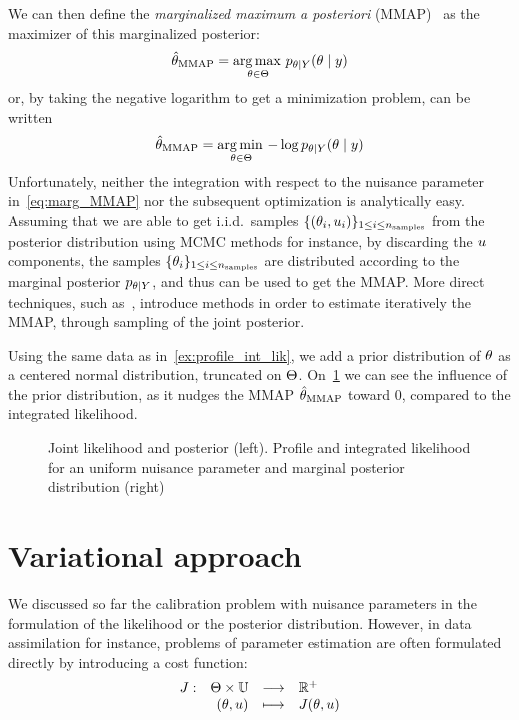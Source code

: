 \documentclass[../../Main_ManuscritThese.tex]{subfiles}
\newcommand\imgpath{/home/victor/acadwriting/Manuscrit/Text/Chapter3/img/}
\begin{document}
We can then define the \emph{marginalized maximum a posteriori} (MMAP)~\cite{doucet_marginal_2002} as the  maximizer of this marginalized posterior:
\begin{equation}
  \label{eq:def_MMAP}
  \hat{\theta}_{\mathrm{MMAP}} = \operatorname*{arg\,max \,}_{\theta\in\Theta} p_{\theta \mid Y}(\theta\mid y)
\end{equation}
or, by taking the negative logarithm to get a minimization problem, can be written
\begin{equation}
\hat{\theta}_{\mathrm{MMAP}} = \operatorname*{arg\,min \,}_{\theta\in\Theta} -\log  p_{\theta\mid Y}(\theta\mid y)
\end{equation}
Unfortunately, neither the integration with respect to the nuisance parameter in~\eqref{eq:marg_MMAP} nor the subsequent optimization is analytically easy.
Assuming that we are able to get i.i.d.\ samples $\{(\theta_i, u_i)\}_{1\leq i \leq n_{\mathrm{samples}}}$ from the posterior distribution using MCMC methods for instance, by discarding the $u$ components, the samples $\{\theta_i\}_{1 \leq i\leq n_{\mathrm{samples}}}$ are distributed according to the marginal posterior $p_{\theta \mid Y}$, and thus can be used to get the MMAP. More direct techniques, such as~\cite{doucet_marginal_2002}, introduce methods in order to estimate iteratively the MMAP, through sampling of the joint posterior.
\begin{example}
  Using the same data as in~\cref{ex:profile_int_lik}, we add a prior distribution of $\theta$ as a centered normal distribution, truncated on $\Theta$. On~\cref{fig:profile_integrated_lik} we can see the influence of the prior distribution, as it nudges the MMAP $\hat{\theta}_{\mathrm{MMAP}}$ toward $0$, compared to the integrated likelihood.
\end{example}
\begin{figure}[ht]
  \centering
  
  \caption{\label{fig:profile_integrated_lik} Joint likelihood and posterior (left). Profile and integrated likelihood for an uniform nuisance parameter and marginal posterior distribution (right)}
\end{figure}
\section{Variational approach}
\label{sec:J_rv}
We discussed so far the calibration problem with nuisance parameters in the formulation of the likelihood or the posterior distribution. However, in data assimilation for instance, problems of parameter estimation are often formulated directly by introducing a cost function:
\begin{equation}
  \begin{array}{rrcl}
    J: &\Theta \times \mathbb{U} &\longrightarrow& \mathbb{R}^+ \\
    &(\theta, u) &\longmapsto &J(\theta, u)
    \end{array}
  \end{equation}
  
\end{document}
